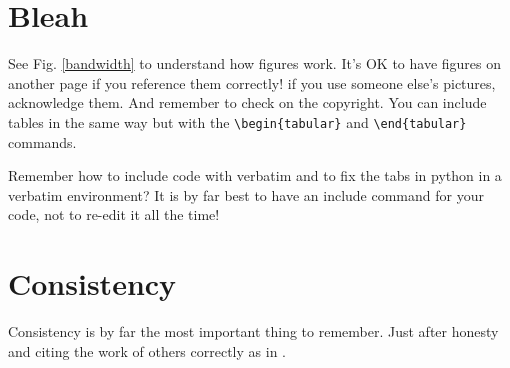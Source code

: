\section{Bleah}
See Fig. \ref{bandwidth} to understand how figures work. It's OK to have figures on another page if you reference them correctly! if you use someone else's pictures, acknowledge them. And remember to check on the copyright. You can include tables in the same way but with the \verb|\begin{tabular}| and
 \verb|\end{tabular}| commands.

Remember how to include code with verbatim and to fix the tabs in python in a verbatim environment? It is by far best to have an include command for your code, not to re-edit it all the time!

\section{Consistency}
Consistency is by far the most important thing to remember. Just after honesty and citing the work of others correctly as in \cite{AD92, Beardon}.
